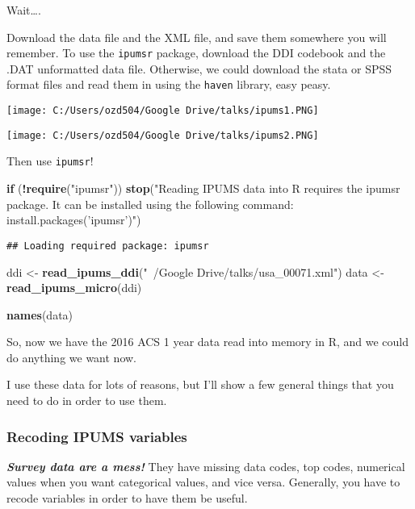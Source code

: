\documentclass[]{article}
\newenvironment{Shaded}{\begin{snugshade}}{\end{snugshade}}
\newcommand{\KeywordTok}[1]{\textcolor[rgb]{0.13,0.29,0.53}{\textbf{#1}}}
\newcommand{\StringTok}[1]{\textcolor[rgb]{0.31,0.60,0.02}{#1}}
\newcommand{\ControlFlowTok}[1]{\textcolor[rgb]{0.13,0.29,0.53}{\textbf{#1}}}
\newcommand{\OperatorTok}[1]{\textcolor[rgb]{0.81,0.36,0.00}{\textbf{#1}}}
\newcommand{\NormalTok}[1]{#1}
\begin{document}
Wait\ldots{}.

Download the data file and the XML file, and save them somewhere you
will remember. To use the \texttt{ipumsr} package, download the DDI
codebook and the .DAT unformatted data file. Otherwise, we could
download the stata or SPSS format files and read them in using the
\texttt{haven} library, easy peasy.

\texttt{[image: C:/Users/ozd504/Google Drive/talks/ipums1.PNG]}

\texttt{[image: C:/Users/ozd504/Google Drive/talks/ipums2.PNG]}

Then use \texttt{ipumsr}!

\begin{Shaded}
\begin{Highlighting}[]
\ControlFlowTok{if}\NormalTok{ (}\OperatorTok{!}\KeywordTok{require}\NormalTok{(}\StringTok{"ipumsr"}\NormalTok{)) }\KeywordTok{stop}\NormalTok{(}\StringTok{"Reading IPUMS data into R requires the ipumsr package. It can be installed using the following command: install.packages('ipumsr')"}\NormalTok{)}
\end{Highlighting}
\end{Shaded}

\begin{verbatim}
## Loading required package: ipumsr
\end{verbatim}

\begin{Shaded}
\begin{Highlighting}[]
\NormalTok{ddi <-}\StringTok{ }\KeywordTok{read_ipums_ddi}\NormalTok{(}\StringTok{"~/Google Drive/talks/usa_00071.xml"}\NormalTok{)}
\NormalTok{data <-}\StringTok{ }\KeywordTok{read_ipums_micro}\NormalTok{(ddi)}


\KeywordTok{names}\NormalTok{(data)}
\end{Highlighting}
\end{Shaded}

So, now we have the 2016 ACS 1 year data read into memory in R, and we
could do anything we want now.

I use these data for lots of reasons, but I'll show a few general things
that you need to do in order to use them.

\subsubsection{Recoding IPUMS variables}\label{recoding-ipums-variables}

\textbf{\emph{Survey data are a mess!}} They have missing data codes,
top codes, numerical values when you want categorical values, and vice
versa. Generally, you have to recode variables in order to have them be
useful.
\end{document}
